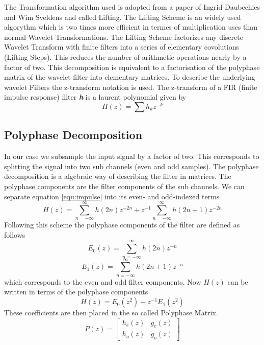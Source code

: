 \begin{refsection}
The Transformation algorithm used is adopted from a paper of Ingrid Daubechies and Wim Sveldens \cite{fpga:Daubechies1998} and called Lifting. 
The Lifting Scheme is an widely used algorythm which is two times more efficient in termes of multiplication uses than normal Wavelet Transformations.
The Lifting Scheme factorizes any discrete Wavelet Transform  with finite filters into a series of elementary covolutions (Lifting Steps).
This reduces the number of arithmetic operations nearly by a factor of two.
This decomposition is equivalent to a factorisation of the polyphase matrix of the wavelet filter into elementary matrices. 
To describe the underlying wavelet Filters the z-transform notation is used.
The z-transform of a FIR (finite impulse response) filter \textit{\textbf{h}} is a laurent polynomial given by
\begin{equation}\label{equ:impulse}
	H(z) = \sum h_k z^{-k}
\end{equation}


\subsection{Polyphase Decomposition \label{fpga:polyphase}}

In our case we subsample the input signal by a factor of two.
This corresponds to splitting the signal into two sub channels (even and odd samples).
The polyphase decomposition is a algebraic way of describing the filter in matrices.
The polyphase components are the filter components of the sub channels. 
We can separate equation \ref{equ:impulse} into its even- and odd-indexed terms
\begin{equation}
	H(z) = \sum_{n=-\infty}^{\infty} h(2n)z^{-2n} + z^{-1} \sum_{n=-\infty}^{\infty} h(2n+1)z^{-2n}
\end{equation}
Following this scheme the polyphase components of the filter are defined as follows
\begin{equation}
E_0(z) = \sum_{n=-\infty}^{\infty} h(2n)z^{-n}
\end{equation}
\begin{equation}
E_1(z) = \sum_{n=-\infty}^{\infty} h(2n+1)z^{-n}
\end{equation}
which corresponds to the even and odd filter components.
Now $H(z)$ can be written in terms of the polyphase components
\begin{equation}
H(z)=E_{0}(z^2)+z^{-1} E_1(z^2)
\end{equation}
These coefficients are then placed in the so called Polyphase Matrix.
\begin{equation}
	P(z) = 
	\begin{bmatrix}
	h_e(z) & g_e(z) \\
	h_o(z) & g_o(z)
	\end{bmatrix}
\end{equation}


\end{refsection}
